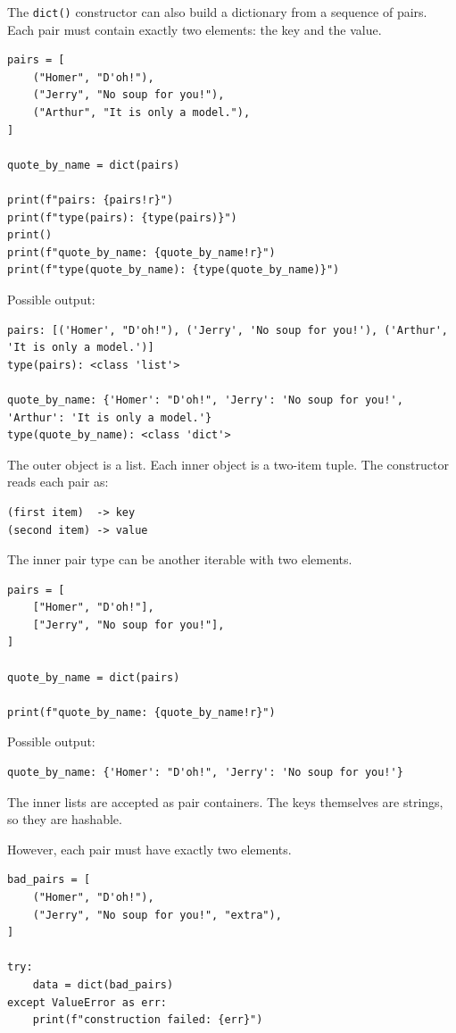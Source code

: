 The \texttt{dict()} constructor can also build a dictionary from a sequence of pairs. Each pair must contain exactly two elements: the key and the value.

\begin{verbatim}
pairs = [
    ("Homer", "D'oh!"),
    ("Jerry", "No soup for you!"),
    ("Arthur", "It is only a model."),
]

quote_by_name = dict(pairs)

print(f"pairs: {pairs!r}")
print(f"type(pairs): {type(pairs)}")
print()
print(f"quote_by_name: {quote_by_name!r}")
print(f"type(quote_by_name): {type(quote_by_name)}")
\end{verbatim}

Possible output:

\begin{verbatim}
pairs: [('Homer', "D'oh!"), ('Jerry', 'No soup for you!'), ('Arthur', 'It is only a model.')]
type(pairs): <class 'list'>

quote_by_name: {'Homer': "D'oh!", 'Jerry': 'No soup for you!', 'Arthur': 'It is only a model.'}
type(quote_by_name): <class 'dict'>
\end{verbatim}

The outer object is a list. Each inner object is a two-item tuple. The constructor reads each pair as:

\begin{verbatim}
(first item)  -> key
(second item) -> value
\end{verbatim}

The inner pair type can be another iterable with two elements.

\begin{verbatim}
pairs = [
    ["Homer", "D'oh!"],
    ["Jerry", "No soup for you!"],
]

quote_by_name = dict(pairs)

print(f"quote_by_name: {quote_by_name!r}")
\end{verbatim}

Possible output:

\begin{verbatim}
quote_by_name: {'Homer': "D'oh!", 'Jerry': 'No soup for you!'}
\end{verbatim}

The inner lists are accepted as pair containers. The keys themselves are strings, so they are hashable.

However, each pair must have exactly two elements.

\begin{verbatim}
bad_pairs = [
    ("Homer", "D'oh!"),
    ("Jerry", "No soup for you!", "extra"),
]

try:
    data = dict(bad_pairs)
except ValueError as err:
    print(f"construction failed: {err}")
\end{verbatim}

